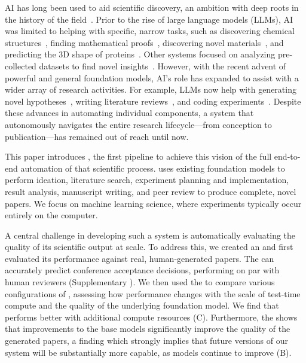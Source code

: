 AI has long been used to aid scientific discovery, an ambition with deep roots in the history of the field~\citep{waltz2009automating,langley2024integrated,langley1987scientific,lenat1977automated,lenat1984and}.
Prior to the rise of large language models (LLMs), AI was limited to helping with specific, narrow tasks, such as discovering chemical structures~\citep{buchanan1981dendral}, finding mathematical proofs~\citep{lenat1977automated}, discovering novel materials~\citep{pyzer2022alphamaterials,merchant2023scaling,szymanski2023autonomous}, and predicting the 3D shape of proteins~\citep{jumper2021alphafold, hayes2024simulating}.
Other systems focused on analyzing pre-collected datasets to find novel insights~\citep{langley1987scientific,ifargan2024autonomousllmdrivenresearchdata, falkenhainer1986integrating}.
However, with the recent advent of powerful and general foundation models, AI's role has expanded to assist with a wider array of research activities.
For example, LLMs now help with generating novel hypotheses~\citep{girotra2023ideas,lehman2022evolutionlargemodels,lu2025automated,omniepic,hu2025automated}, writing literature reviews~\citep{baek2024researchagentiterativeresearchidea,wang2024autosurveylargelanguagemodels}, and coding experiments~\citep{huang2024mlagentbench,lu2024discovering,ma2023eureka,zhang2025darwin}.
Despite these advances in automating individual components, a system that autonomously navigates the entire research lifecycle---from conception to publication---has remained out of reach until now.

This paper introduces \ouralgo, the first pipeline to achieve this vision of the full end-to-end automation of that scientific process.
\ouralgo uses existing foundation models to perform ideation, literature search, experiment planning and implementation, result analysis, manuscript writing, and peer review to produce complete, novel papers.
We focus on machine learning science, where experiments typically occur entirely on the computer.

A central challenge in developing such a system is automatically evaluating the quality of its scientific output at scale.
To address this, we created an \ourreviewer and first evaluated its performance against real, human-generated papers.
The \ourreviewer can accurately predict conference acceptance decisions, performing on par with human reviewers (Supplementary ).
We then used the \ourreviewer to compare various configurations of \ouralgo, assessing how performance changes with the scale of test-time compute and the quality of the underlying foundation model.
We find that \ouralgo performs better with additional compute resources (C).
Furthermore, the \ourreviewer shows that improvements to the base models significantly improve the quality of the generated papers, a finding which strongly implies that future versions of our system will be substantially more capable, as models continue to improve (B).

